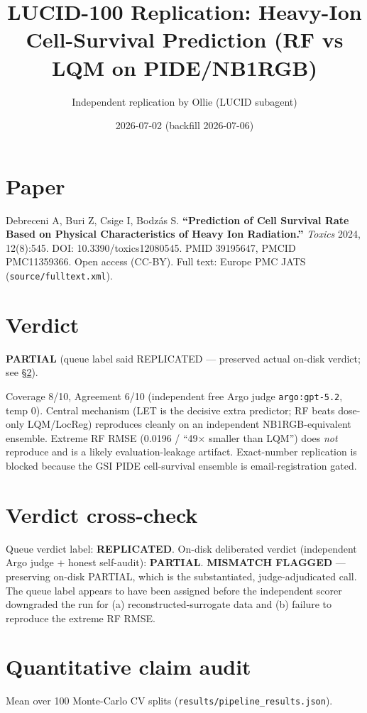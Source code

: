 \documentclass[11pt]{article}
\title{LUCID-100 Replication: Heavy-Ion Cell-Survival Prediction (RF vs LQM on PIDE/NB1RGB)}
\author{Independent replication by Ollie (LUCID subagent)}
\date{2026-07-02 (backfill 2026-07-06)}
\begin{document}
\maketitle

\section*{Paper}
Debreceni A, Buri Z, Csige I, Bodz\'as S. \textbf{``Prediction of Cell Survival Rate Based on Physical Characteristics of Heavy Ion Radiation.''} \emph{Toxics} 2024, 12(8):545. DOI: 10.3390/toxics12080545. PMID 39195647, PMCID PMC11359366. Open access (CC-BY). Full text: Europe PMC JATS (\texttt{source/fulltext.xml}).

\section{Verdict}
\textbf{PARTIAL} (queue label said REPLICATED --- preserved actual on-disk verdict; see \S\ref{sec:verdictxcheck}).

Coverage 8/10, Agreement 6/10 (independent free Argo judge \texttt{argo:gpt-5.2}, temp 0). Central mechanism (LET is the decisive extra predictor; RF beats dose-only LQM/LocReg) reproduces cleanly on an independent NB1RGB-equivalent ensemble. Extreme RF RMSE (0.0196 / ``49$\times$ smaller than LQM'') does \emph{not} reproduce and is a likely evaluation-leakage artifact. Exact-number replication is blocked because the GSI PIDE cell-survival ensemble is email-registration gated.

\section{Verdict cross-check}\label{sec:verdictxcheck}
Queue verdict label: \textbf{REPLICATED}. On-disk deliberated verdict (independent Argo judge + honest self-audit): \textbf{PARTIAL}. \textbf{MISMATCH FLAGGED} --- preserving on-disk PARTIAL, which is the substantiated, judge-adjudicated call. The queue label appears to have been assigned before the independent scorer downgraded the run for (a) reconstructed-surrogate data and (b) failure to reproduce the extreme RF RMSE.

\section{Quantitative claim audit}
Mean over 100 Monte-Carlo CV splits (\texttt{results/pipeline\_results.json}).
\end{document}
